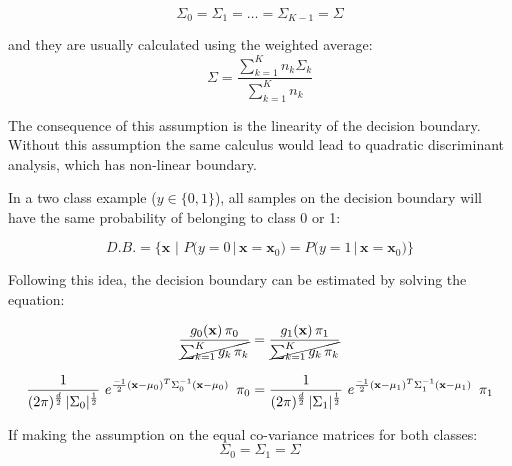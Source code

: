 \documentclass{article}
\begin{document}
\begin{equation} 
\Sigma_0 = \Sigma_1 = \dots = \Sigma_{K-1} = \Sigma
\end{equation}

\noindent
and they are usually calculated using the weighted average:
\begin{equation} 
\Sigma = \frac{\sum_{k=1}^K {n_k\Sigma_k}}{\sum_{k=1}^K{n_k}}
\end{equation}

\noindent
The consequence of this assumption is the linearity of the decision boundary. Without this assumption the same calculus would lead to quadratic discriminant analysis, which has non-linear boundary.

In a two class example ($y \in \{0,1\}$), all samples on the decision boundary will have the same probability of belonging to class 0 or 1:

\begin{equation} 
D.B. = \Big\{\mathbf{x}\,\, \Big| \,\,P\big(y=0 \, \big| \, \mathbf{x}=\mathbf{x}_0\big) = P\big(y=1 \, \big| \, \mathbf{x}=\mathbf{x}_0\big) \Big\}
\end{equation}

Following this idea, the decision boundary can be estimated by solving the equation:

\begin{equation} 
\frac{g_0(\mathbf{x}) \, \pi_0} {\cancel{\sum_{k=1}^K{g_k \, \pi_k}}} = \frac{g_1(\mathbf{x}) \, \pi_1} {\cancel{\sum_{k=1}^K{g_k \, \pi_k}}}
\end{equation}


\begin{equation} 
\frac{1}{(2 \pi)^{\nicefrac{d}{2}}\, |\Sigma_0|^{\nicefrac{1}{2}}}\,\, e^{\nicefrac{-1}{2}  (\mathbf{x}-\mu_0)^T  \Sigma_0^{-1} (\mathbf{x}-\mu_0)}  \,\,\,\pi_0 = \\
\frac{1}{(2 \pi)^{\nicefrac{d}{2}}\, |\Sigma_1|^{\nicefrac{1}{2}}}\,\, e^{\nicefrac{-1}{2}  (\mathbf{x}-\mu_1)^T  \Sigma_1^{-1} (\mathbf{x}-\mu_1)}  \,\,\,\pi_1
\end{equation}

If making the assumption on the equal co-variance matrices for both classes:
\begin{equation} 
\Sigma_0 = \Sigma_1  = \Sigma
\end{equation}
\end{document}
